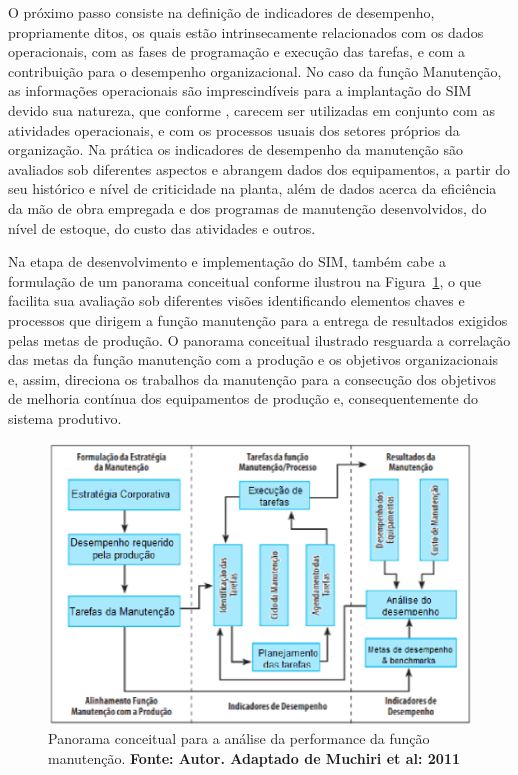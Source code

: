 O próximo passo consiste na definição de indicadores de desempenho, propriamente ditos, os quais estão intrinsecamente relacionados com os dados operacionais, com as fases de programação e execução das tarefas, e com a contribuição para o desempenho organizacional. No caso da função Manutenção, as informações operacionais são imprescindíveis para a implantação do SIM devido sua natureza, que conforme \cite{martorell1999}, carecem ser utilizadas em conjunto com as atividades operacionais, e com os processos usuais dos setores próprios da organização. Na prática os indicadores de desempenho da manutenção são avaliados sob diferentes aspectos e abrangem dados dos equipamentos, a partir do seu histórico e nível de criticidade na planta, além de dados acerca da eficiência da mão de obra empregada e dos programas de manutenção desenvolvidos, do nível de estoque, do custo das atividades e outros.

Na etapa de desenvolvimento e implementação do SIM, também cabe a formulação de um panorama conceitual conforme ilustrou \cite{muchiri2011development} na Figura~\ref{Desempenho da funcao manutencao}, o que facilita sua avaliação sob diferentes visões identificando elementos chaves e processos que dirigem a função manutenção para a entrega de resultados exigidos pelas metas de produção. O panorama conceitual ilustrado resguarda a correlação das metas da função manutenção com a produção e os objetivos organizacionais e, assim, direciona os trabalhos da manutenção para a consecução dos objetivos de melhoria contínua dos equipamentos de produção e, consequentemente do sistema produtivo.

\graphicspath{{figuras/}}
\begin{figure}[H]
\centering
\includegraphics[width=1\textwidth]{desempenho_da_funcao_manutencao.eps}
\caption{Panorama conceitual para a análise da performance da função manutenção. \textbf{Fonte: Autor. Adaptado de Muchiri et al: 2011}}
\label{Desempenho da funcao manutencao}
\end{figure}

